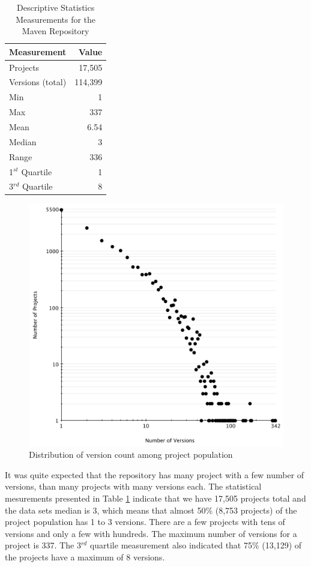 \documentclass[conference]{IEEEtran}
\begin{document}
\begin{table}
\centering
\caption{Descriptive Statistics Measurements for the Maven Repository}
\label{tbl:repository}
\begin{tabular}{l r}
\hline
Measurement & Value\\
 \hline
Projects & 17,505\\
Versions (total) & 114,399\\
Min & 1\\
Max & 337\\
Mean & 6.54\\
Median & 3\\
Range & 336\\
1$^{st}$ Quartile & 1\\
3$^{rd}$ Quartile & 8\\
\hline
\end{tabular}
\end{table}

\begin{figure}
	\centering
	\includegraphics[scale=0.6]{version_count.pdf}
	\caption{Distribution of version count among project population}
	\label{fig:version-count}
\end{figure}

It was quite expected that the repository has many project with a few number of versions, than many projects with many versions each. The statistical mesurements presented in Table \ref{tbl:repository} indicate that we have 17,505 projects total and the data sets median is 3, which means that almost 50\% (8,753 projects) of the project population has 1 to 3 versions. There are a few projects with tens of versions and only a few with hundreds. The maximum number of versions for a project is 337. The 3$^{rd}$ quartile measurement also indicated that 75\% (13,129) of the projects have a maximum of 8 versions.
\end{document}
